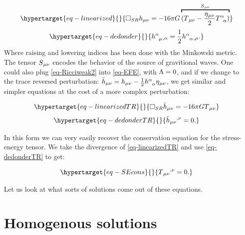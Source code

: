 \documentclass[
  10pt,
  a4paper,
  DIV=11,
  numbers=noendperiod,
  oneside]{scrreprt}
\DeclareRobustCommand{\[}{\begin{equation}}
\DeclareRobustCommand{\]}{\end{equation}}
\begin{document}
\begin{equation}\protect\hypertarget{eq-linearized}{}{
\square_{SR} \weakmet = -16\pi \grav \overbracket{(\SEco-\frac{\mink}{2}\trSE)}^{\srcco} 
}\label{eq-linearized}\end{equation}
\begin{equation}\protect\hypertarget{eq-dedonder}{}{
\ipdv{\mixweakmet[\ind{\alpha}{\mu}]}{\alpha}=\frac{1}{2}\ipdv{\trweakmet}{\mu}. 
}\label{eq-dedonder}\end{equation} Where raising and lowering indices
has been done with the Minkowski metric. The tensor \(S{}_{\mu\nu}\) encodes
the behavior of the source of gravitional waves. One could also plug
\ref{eq-Ricciweak2} into \ref{eq-EFE}, with \(\Lambda=0\), and if we
change to the trace reversed perturbation:
\(\weakTRmet=\weakmet - \frac{1}{2}\trweakmet\mink\), we get similar and
simpler equations at the cost of a more complex perturbation:
 

\begin{equation}\protect\hypertarget{eq-linearizedTR}{}{
\square_{SR} \weakTRmet = -16\pi \grav \SEco
}\label{eq-linearizedTR}\end{equation}
\begin{equation}\protect\hypertarget{eq-dedonderTR}{}{
    \ipdv[^]{\weakTRmet}{\nu}=0. 
}\label{eq-dedonderTR}\end{equation}

In this form we can very easily recover the conservation equation for
the stress-energy tensor. We take the divergence of
\ref{eq-linearizedTR} and use \ref{eq-dedonderTR} to get:

\begin{equation}\protect\hypertarget{eq-SEcons}{}{
    \ipdv[^]{\SEco}{\nu}=0.
}\label{eq-SEcons}\end{equation}

Let us look at what sorts of solutions come out of these equations.

\hypertarget{homogenous-solutions}{%
\section{Homogenous solutions}\label{homogenous-solutions}}
\end{document}
